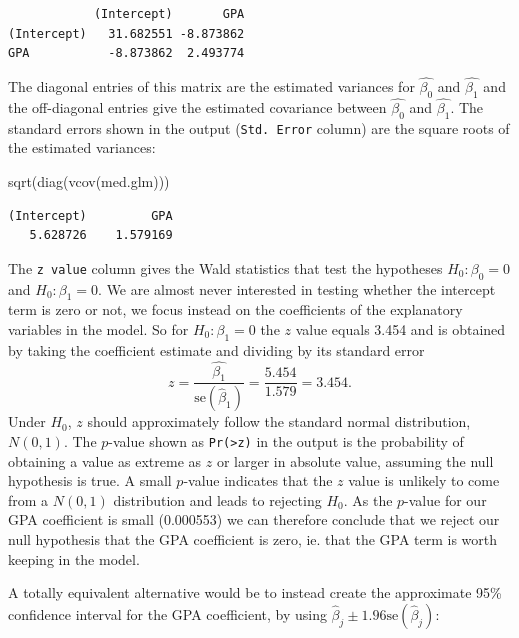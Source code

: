 \documentclass[
  a4paper,
  DIV=11,
  numbers=noendperiod]{scrreprt}
\newenvironment{Shaded}{\begin{snugshade}}{\end{snugshade}}
\newcommand{\FunctionTok}[1]{\textcolor[rgb]{0.28,0.35,0.67}{#1}}
\newcommand{\NormalTok}[1]{\textcolor[rgb]{0.00,0.23,0.31}{#1}}
\newenvironment{fbxSimple}[3]{\begin{tcolorbox}[enhanced, breakable,%
attach boxed title to top*={xshift=1.4pt},
boxed title style={boxrule=0.0mm, fuzzy shadow={1pt}{-1pt}{0mm}{0.1mm}{gray}, arc=.3em, rounded corners=east, sharp corners=west}, colframe=#1-color2, colbacktitle=#1-color1, colback = white, coltitle=black,  titlerule=0mm, toprule=0pt, bottomrule=.7pt, leftrule=.3em, rightrule=.7pt, outer arc=.3em,  	left=.5em, right=.5em, bottomtitle=1mm, toptitle=1mm,title=\textbf{#2}\hspace{0.5em}{#3}]}
{\end{tcolorbox}}
\begin{document}
\begin{fbxSimple}{Example}{Example 8: }{Hypothesis test and confidence interval for the GPA coefficient in the model for medical school admissions}
\begin{verbatim}
            (Intercept)       GPA
(Intercept)   31.682551 -8.873862
GPA           -8.873862  2.493774
\end{verbatim}

The diagonal entries of this matrix are the estimated variances for
\(\hat{\beta_0}\) and \(\hat{\beta_1}\) and the off-diagonal entries
give the estimated covariance between \(\hat{\beta_0}\) and
\(\hat{\beta_1}\). The standard errors shown in the output
(\texttt{Std.\ Error} column) are the square roots of the estimated
variances:

\begin{Shaded}
\begin{Highlighting}[]
\FunctionTok{sqrt}\NormalTok{(}\FunctionTok{diag}\NormalTok{(}\FunctionTok{vcov}\NormalTok{(med.glm)))}
\end{Highlighting}
\end{Shaded}

\begin{verbatim}
(Intercept)         GPA 
   5.628726    1.579169 
\end{verbatim}

The \texttt{z\ value} column gives the Wald statistics that test the
hypotheses \(H_0: \beta_0=0\) and \(H_0: \beta_1=0\). We are almost
never interested in testing whether the intercept term is zero or not,
we focus instead on the coefficients of the explanatory variables in the
model. So for \(H_0: \beta_1=0\) the \(z\) value equals 3.454 and is
obtained by taking the coefficient estimate and dividing by its standard
error
\[z=\frac{\hat{\beta_1}}{\text{se}(\hat{\beta}_1)}=\frac{5.454}{1.579}=3.454.\]
Under \(H_0\), \(z\) should approximately follow the standard normal
distribution, \(N(0,1)\). The \(p\)-value shown as
\texttt{Pr(\textgreater{}\textbar{}z\textbar{})} in the output is the
probability of obtaining a value as extreme as \(z\) or larger in
absolute value, assuming the null hypothesis is true. A small
\(p\)-value indicates that the \(z\) value is unlikely to come from a
\(N(0,1)\) distribution and leads to rejecting \(H_0\). As the
\(p\)-value for our GPA coefficient is small (0.000553) we can therefore
conclude that we reject our null hypothesis that the GPA coefficient is
zero, ie. that the GPA term is worth keeping in the model.

A totally equivalent alternative would be to instead create the
approximate 95\% confidence interval for the GPA coefficient, by using
\(\hat{\beta}_j\pm 1.96\text{se}(\hat{\beta}_j)\):


\end{fbxSimple}
\end{document}
